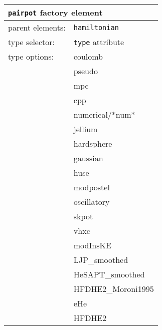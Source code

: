 \begin{table}[h]
\begin{center}
\begin{tabularx}{\textwidth}{l l l l l l }
\hline
\multicolumn{6}{l}{\texttt{pairpot} factory element} \\
\hline
\multicolumn{2}{l}{parent elements:} & \multicolumn{4}{l}{\texttt{hamiltonian}}\\
\multicolumn{2}{l}{type   selector:} & \multicolumn{4}{l}{\texttt{type} attribute}\\
\multicolumn{2}{l}{type   options: } & \multicolumn{4}{l}{coulomb}\\
\multicolumn{2}{l}{                } & \multicolumn{4}{l}{pseudo}\\
\multicolumn{2}{l}{                } & \multicolumn{4}{l}{mpc}\\
\multicolumn{2}{l}{                } & \multicolumn{4}{l}{cpp}\\
\multicolumn{2}{l}{                } & \multicolumn{4}{l}{numerical/*num*}\\
\multicolumn{2}{l}{                } & \multicolumn{4}{l}{jellium}\\
\multicolumn{2}{l}{                } & \multicolumn{4}{l}{hardsphere}\\
\multicolumn{2}{l}{                } & \multicolumn{4}{l}{gaussian}\\
\multicolumn{2}{l}{                } & \multicolumn{4}{l}{huse}\\
\multicolumn{2}{l}{                } & \multicolumn{4}{l}{modpostel}\\
\multicolumn{2}{l}{                } & \multicolumn{4}{l}{oscillatory}\\
\multicolumn{2}{l}{                } & \multicolumn{4}{l}{skpot}\\
\multicolumn{2}{l}{                } & \multicolumn{4}{l}{vhxc}\\
\multicolumn{2}{l}{                } & \multicolumn{4}{l}{modInsKE}\\
\multicolumn{2}{l}{                } & \multicolumn{4}{l}{LJP\_smoothed}\\
\multicolumn{2}{l}{                } & \multicolumn{4}{l}{HeSAPT\_smoothed}\\
\multicolumn{2}{l}{                } & \multicolumn{4}{l}{HFDHE2\_Moroni1995}\\
\multicolumn{2}{l}{                } & \multicolumn{4}{l}{eHe}\\
\multicolumn{2}{l}{                } & \multicolumn{4}{l}{HFDHE2}\\

\end{tabularx}
\end{center}
\end{table}
